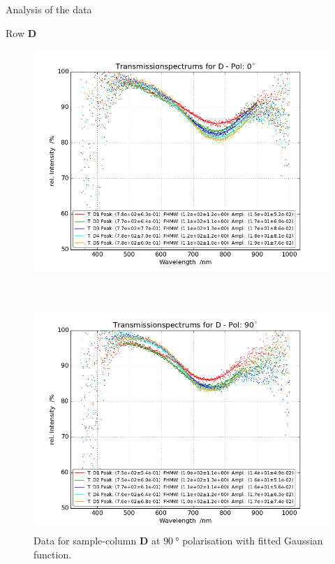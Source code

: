 \documentclass[pdftex, a4paper,11pt, twoside, UKenglish]{report}
\begin{document}
\begin{chapter}{Analysis of the data}
\begin{section}{Row \textbf{D}}
      \newpage
      \begin{figure}[ht!]
        \centering
        \begin{minipage}{.95\textwidth}
          \centering
          \includegraphics[width=\textwidth]
              {Figures/TransspecFIT_DPol0_1to5.png}
          \caption{Data for sample-column \textbf{D} at $\SI{0}{\degree}$
              polarisation with fitted Gaussian function.}
          \label{fig:TransspecFIT_DPol0_1to5}
        \end{minipage}\\
        \begin{minipage}{.95\textwidth}
          \centering
          \includegraphics[width=\textwidth]
              {Figures/TransspecFIT_DPol90_1to5.png}
          \caption{Data for sample-column \textbf{D} at $\SI{90}{\degree}$
              polarisation with fitted Gaussian function.}
          \label{fig:TransspecFIT_DPol90_1to5}
        \end{minipage}
      \end{figure}
      

\end{section}
\end{chapter}
\end{document}
